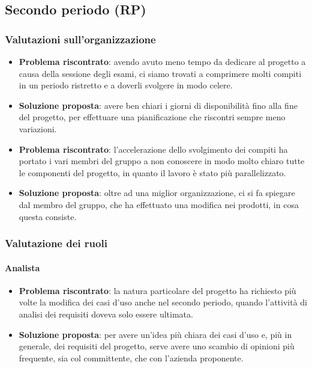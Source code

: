     \subsection{Secondo periodo (RP)}\label{valutazioni per il miglioramento:RP}
    
    \subsubsection{Valutazioni sull'organizzazione}
        \begin{itemize}
            \item \textbf{Problema riscontrato}: avendo avuto meno tempo da dedicare al progetto a causa della sessione degli esami, ci siamo trovati a comprimere molti compiti in un periodo ristretto e a doverli svolgere in modo celere.
            \item \textbf{Soluzione proposta}: avere ben chiari i giorni di disponibilità fino alla fine del progetto, per effettuare una pianificazione che riscontri sempre meno variazioni.
            \item \textbf{Problema riscontrato}: l'accelerazione dello svolgimento dei compiti ha portato i vari membri del gruppo a non conoscere in modo molto chiaro tutte le componenti del progetto, in quanto il lavoro è stato più parallelizzato.
            \item \textbf{Soluzione proposta}: oltre ad una miglior organizzazione, ci si fa spiegare dal membro del gruppo, che ha effettuato una modifica nei prodotti, in cosa questa consiste.
        \end{itemize}
    
    \subsubsection{Valutazione dei ruoli}
        
        \paragraph{Analista}
            \begin{itemize}
                \item \textbf{Problema riscontrato}: la natura particolare del progetto ha richiesto più volte la modifica dei casi d'uso anche nel secondo periodo, quando l'attività di analisi dei requisiti doveva solo essere ultimata.
                \item \textbf{Soluzione proposta}: per avere un'idea più chiara dei casi d'uso e, più in generale, dei requisiti del progetto, serve avere uno scambio di opinioni più frequente, sia col committente, che con l'azienda proponente.
            \end{itemize}
        
